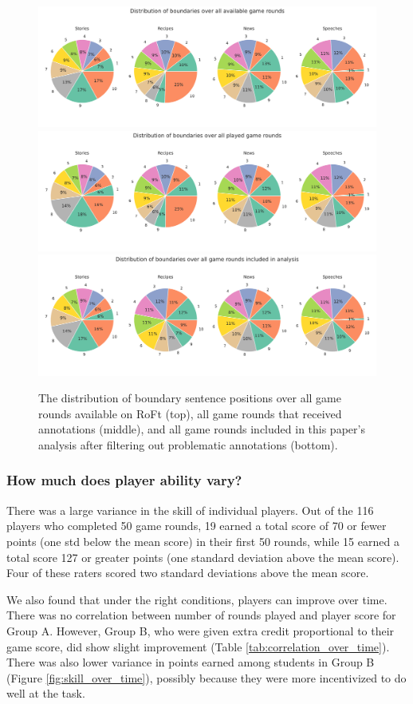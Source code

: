\begin{figure}
    \centering
    \includegraphics[width=0.8\linewidth]{figures/available_game_rounds.pdf}
    \includegraphics[width=0.8\linewidth]{figures/played_game_rounds.pdf}
    \includegraphics[width=0.8\linewidth]{figures/analyzed_game_rounds.pdf}
    \caption{The distribution of boundary sentence positions over all game rounds available on RoFt (top), all game rounds that received annotations (middle), and all game rounds included in this paper's analysis after filtering out problematic annotations (bottom).}
    \label{fig:distribution_true_boundaries}
\end{figure}

\subsubsection{How much does player ability vary?}
There was a large variance in the skill of individual players.
Out of the 116 players who completed 50 game rounds, 19 earned a total score of 70 or fewer points (one std below the mean score) in their first 50 rounds, while 15 earned a total score 127 or greater points (one standard deviation above the mean score). Four of these raters scored two standard deviations above the mean score.

We also found that under the right conditions, players can improve over time.
There was no correlation between number of rounds played and player score for Group A.
However, Group B, who were given extra credit proportional to their game score, did show slight improvement (Table \ref{tab:correlation_over_time}). 
There was also lower variance in points earned among students in Group B (Figure \ref{fig:skill_over_time}), possibly because they were more incentivized to do well at the task.

